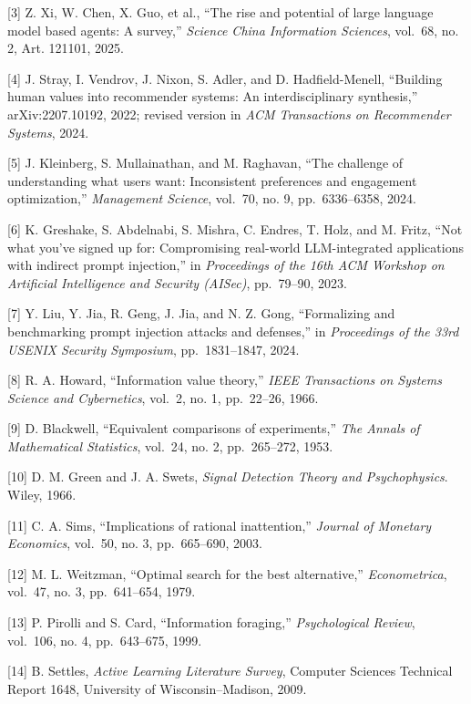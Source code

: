 \documentclass[
  conference,10pt]{IEEEtran}
\begin{document}
{[}3{]} Z. Xi, W. Chen, X. Guo, et al., ``The rise and potential of large language model based agents: A survey,'' \emph{Science China Information Sciences}, vol.~68, no. 2, Art. 121101, 2025.

{[}4{]} J. Stray, I. Vendrov, J. Nixon, S. Adler, and D. Hadfield-Menell, ``Building human values into recommender systems: An interdisciplinary synthesis,'' arXiv:2207.10192, 2022; revised version in \emph{ACM Transactions on Recommender Systems}, 2024.

{[}5{]} J. Kleinberg, S. Mullainathan, and M. Raghavan, ``The challenge of understanding what users want: Inconsistent preferences and engagement optimization,'' \emph{Management Science}, vol.~70, no. 9, pp.~6336--6358, 2024.

{[}6{]} K. Greshake, S. Abdelnabi, S. Mishra, C. Endres, T. Holz, and M. Fritz, ``Not what you've signed up for: Compromising real-world LLM-integrated applications with indirect prompt injection,'' in \emph{Proceedings of the 16th ACM Workshop on Artificial Intelligence and Security (AISec)}, pp.~79--90, 2023.

{[}7{]} Y. Liu, Y. Jia, R. Geng, J. Jia, and N. Z. Gong, ``Formalizing and benchmarking prompt injection attacks and defenses,'' in \emph{Proceedings of the 33rd USENIX Security Symposium}, pp.~1831--1847, 2024.

{[}8{]} R. A. Howard, ``Information value theory,'' \emph{IEEE Transactions on Systems Science and Cybernetics}, vol.~2, no. 1, pp.~22--26, 1966.

{[}9{]} D. Blackwell, ``Equivalent comparisons of experiments,'' \emph{The Annals of Mathematical Statistics}, vol.~24, no. 2, pp.~265--272, 1953.

{[}10{]} D. M. Green and J. A. Swets, \emph{Signal Detection Theory and Psychophysics}. Wiley, 1966.

{[}11{]} C. A. Sims, ``Implications of rational inattention,'' \emph{Journal of Monetary Economics}, vol.~50, no. 3, pp.~665--690, 2003.

{[}12{]} M. L. Weitzman, ``Optimal search for the best alternative,'' \emph{Econometrica}, vol.~47, no. 3, pp.~641--654, 1979.

{[}13{]} P. Pirolli and S. Card, ``Information foraging,'' \emph{Psychological Review}, vol.~106, no. 4, pp.~643--675, 1999.

{[}14{]} B. Settles, \emph{Active Learning Literature Survey}, Computer Sciences Technical Report 1648, University of Wisconsin--Madison, 2009.
\end{document}
